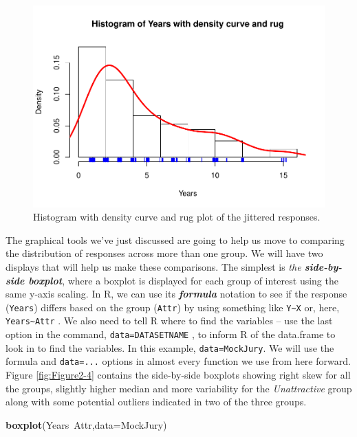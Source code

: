 \documentclass[]{book}
\newenvironment{Shaded}{\begin{snugshade}}{\end{snugshade}}
\newcommand{\KeywordTok}[1]{\textcolor[rgb]{0.13,0.29,0.53}{\textbf{{#1}}}}
\newcommand{\DataTypeTok}[1]{\textcolor[rgb]{0.13,0.29,0.53}{{#1}}}
\newcommand{\NormalTok}[1]{{#1}}
\begin{document}
\begin{figure}[htbp]
\centering
\includegraphics{GreenwoodBanner_files/figure-latex/Figure2-3-1.pdf}
\caption{\label{fig:Figure2-3}Histogram with density curve and rug plot of the jittered
responses.}
\end{figure}

The graphical tools we've just discussed are going to help us move to
comparing the distribution of responses across more than one group. We
will have two displays that will help us make these comparisons. The
simplest is \emph{the \textbf{side-by-side boxplot}}, where a boxplot is
displayed for each group of interest using the same y-axis scaling. In
R, we can use its \textbf{\emph{formula}} notation to see if the
response (\texttt{Years}) differs based on the group (\texttt{Attr}) by
using something like \texttt{Y\textasciitilde{}X} or, here,
\texttt{Years\textasciitilde{}Attr} . We also need to tell R where to
find the variables -- use the last option in the command,
\texttt{data=DATASETNAME} , to inform R of the data.frame to look in to
find the variables. In this example, \texttt{data=MockJury}. We will use
the formula and \texttt{data=...} options in almost every function we
use from here forward. Figure \ref{fig:Figure2-4} contains the
side-by-side boxplots showing right skew for all the groups, slightly
higher median and more variability for the \emph{Unattractive} group
along with some potential outliers indicated in two of the three groups.



\begin{Shaded}
\begin{Highlighting}[]
\KeywordTok{boxplot}\NormalTok{(Years~Attr,}\DataTypeTok{data=}\NormalTok{MockJury)}
\end{Highlighting}
\end{Shaded}
\end{document}
